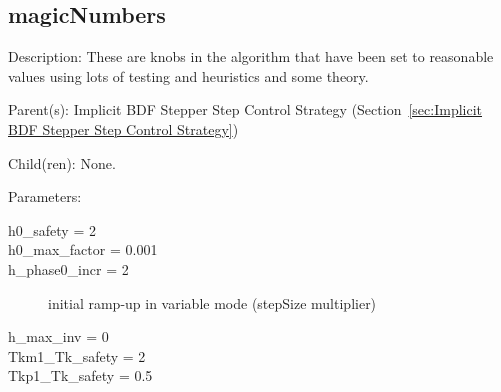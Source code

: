 \subsection{magicNumbers}
\label{sec:magicNumbers}

\begin{list}{}
  {\setlength{\leftmargin}{1.0in}
   \setlength{\labelwidth}{0.75in}
   \setlength{\labelsep}{0.125in}}
  \item[Description:]
    These are knobs in the algorithm that have been set to reasonable values using lots of testing and heuristics and some theory.
  \item[Parent(s):]
    Implicit BDF Stepper Step Control Strategy (Section~\ref{sec:Implicit BDF Stepper Step Control Strategy})
  \item[Child(ren):]
    None. 
  \item[Parameters:]
    \begin{description}
      \item[h0\_safety = 2] 

      \item[h0\_max\_factor = 0.001] 

      \item[h\_phase0\_incr = 2] 
initial ramp-up in variable mode (stepSize multiplier)
      \item[h\_max\_inv = 0] 

      \item[Tkm1\_Tk\_safety = 2] 

      \item[Tkp1\_Tk\_safety = 0.5] 


\end{description}
\end{list}
